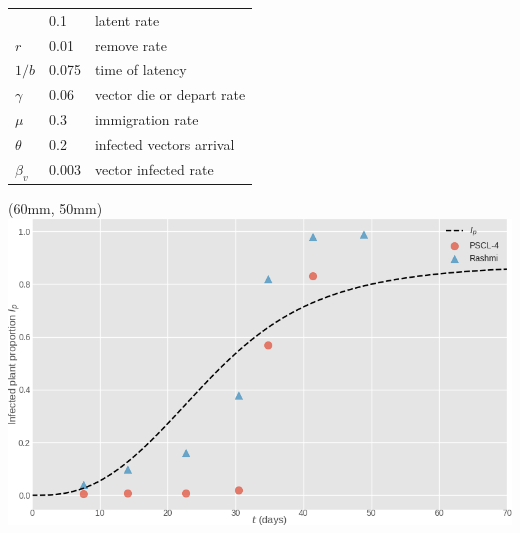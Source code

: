\begin{frame}{}
\begin{textblock*}{60mm}
\begin{tabular}{@{}lll@{}}
                & 0.1 
                & latent rate  
            \\ 
                $r$ 
                & 0.01 
                & remove rate 
            \\
                $1/b$ 
                & 0.075 
                & time of latency
            \\
                $\gamma$ 
                & 0.06 
                & vector die or depart rate 
            \\
                $\mu$ 
                & 0.3 
                & immigration rate 
            \\
                $\theta$ 
                & 0.2 
                & infected vectors 
                    arrival 
                \\
                $\beta_v$ 
                & 0.003 
                & vector infected 
                rate
            \\
            \bottomrule
        \end{tabular}
    \end{textblock*}
    \begin{textblock*}{65mm}(60mm, 50mm)
        \includegraphics[width=\linewidth]{assets/data_dynamics_jegger}
    \end{textblock*}
\end{frame}
